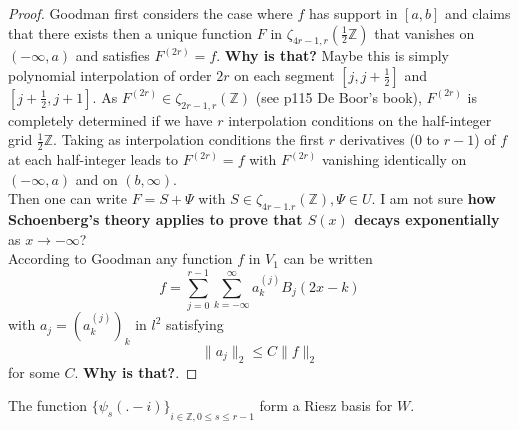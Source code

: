 \documentclass[a4paper, 11pt]{article}
\begin{document}
\begin{proof}
  Goodman first considers the case where $f$ has support in $[a,b]$ and claims that there exists then a unique function 
  $F$ in $\zeta_{4r-1, r}(\frac{1}{2}\mathbb{Z})$ that vanishes on $(-\infty, a)$ and satisfies $F^{(2r)} = f$.  
  \textbf{Why is that?} Maybe this is simply polynomial interpolation of order $2r$ on each segment $[j, j+\frac{1}{2}]$ 
  and $[j+\frac{1}{2}, j+1]$. As $F^{(2r)} \in \zeta_{2r-1, r}(\mathbb{Z})$ (see p115 De Boor's book), $F^{(2r)}$ is 
  completely determined if we have $r$ interpolation conditions on the half-integer grid $\frac{1}{2}\mathbb{Z}$. Taking 
  as interpolation conditions the first $r$ derivatives (0 to $r-1$) of $f$ at each half-integer leads to $F^{(2r)} = f$ 
  with $F^{(2r)}$ vanishing identically on $(-\infty, a)$ and on $(b, \infty)$. \\

  Then one can write $F = S + \Psi$ with $S \in \zeta_{4r-1. r}(\mathbb{Z}), \Psi \in U$. I am not sure \textbf{how 
  Schoenberg's theory applies to prove that $S(x)$ decays exponentially} as $x \to -\infty$? \\

  According to Goodman any function $f$ in $V_1$ can be written
  \begin{equation*}
    f = \sum_{j=0}^{r-1} \sum_{k = -\infty}^{\infty} a_k^{(j)} B_j(2x-k)
  \end{equation*}
  with $a_j = {(a_k^{(j)})}_k$ in $l^2$ satisfying
  \begin{equation*}
    \|a_j\|_2 \leq C \|f\|_2
  \end{equation*}
  for some $C$. \textbf{Why is that?}.
\end{proof}

\begin{cor}{3.2}
  The function ${\{\psi_s(.-i)\}}_{i \in \mathbb{Z}, 0 \leq s \leq r-1}$ form a Riesz basis for $W$.
\end{cor}
\end{document}
